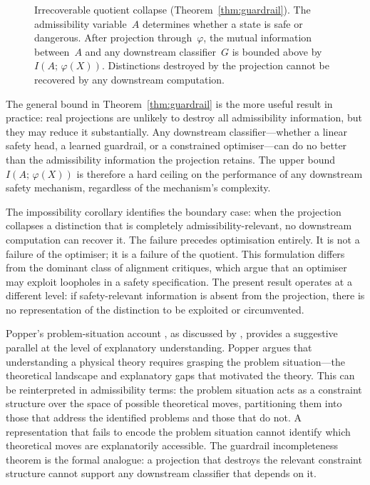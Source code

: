 \documentclass[11pt, a4paper]{article}
\theoremstyle{plain}
\theoremstyle{definition}
\theoremstyle{remark}
\begin{document}
\begin{figure}[t]
\centering
{}
\caption{Irrecoverable quotient collapse (Theorem~\ref{thm:guardrail}).
The admissibility variable~$A$ determines whether a state is safe or
dangerous. After projection through~$\varphi$, the mutual information
between~$A$ and any downstream classifier~$G$ is bounded above by
$I(A;\,\varphi(X))$. Distinctions destroyed by the projection cannot
be recovered by any downstream computation.}
\label{fig:dpi}
\end{figure}

The general bound in Theorem~\ref{thm:guardrail} is the more useful result in
practice: real projections are unlikely to destroy all admissibility information,
but they may reduce it substantially. Any downstream classifier---whether a
linear safety head, a learned guardrail, or a constrained optimiser---can do no
better than the admissibility information the projection retains. The upper bound
$I(A;\, \varphi(X))$ is therefore a hard ceiling on the performance of any
downstream safety mechanism, regardless of the mechanism's complexity.

The impossibility corollary identifies the boundary case: when the projection
collapses a distinction that is completely admissibility-relevant, no downstream
computation can recover it. The failure precedes optimisation entirely. It is
not a failure of the optimiser; it is a failure of the quotient. This formulation
differs from the dominant class of alignment critiques, which argue that an
optimiser may exploit loopholes in a safety specification. The present result
operates at a different level: if safety-relevant information is absent from the
projection, there is no representation of the distinction to be exploited or
circumvented.

Popper's problem-situation account \citep{popper1979objective}, as discussed by
\citet{gupta2025world}, provides a suggestive parallel at the level of
explanatory understanding. Popper argues that understanding a physical theory
requires grasping the problem situation---the theoretical landscape and
explanatory gaps that motivated the theory. This can be reinterpreted in
admissibility terms: the problem situation acts as a constraint structure over
the space of possible theoretical moves, partitioning them into those that address
the identified problems and those that do not. A representation that fails to
encode the problem situation cannot identify which theoretical moves are
explanatorily accessible. The guardrail incompleteness theorem is the formal
analogue: a projection that destroys the relevant constraint structure cannot
support any downstream classifier that depends on it.
\end{document}
